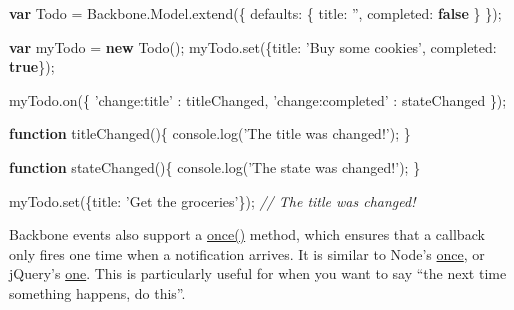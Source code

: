 \documentclass[9pt]{book}
\newenvironment{Shaded}{}{}
\newcommand{\KeywordTok}[1]{\textcolor[rgb]{0.00,0.44,0.13}{\textbf{{#1}}}}
\newcommand{\DataTypeTok}[1]{\textcolor[rgb]{0.56,0.13,0.00}{{#1}}}
\newcommand{\StringTok}[1]{\textcolor[rgb]{0.25,0.44,0.63}{{#1}}}
\newcommand{\CommentTok}[1]{\textcolor[rgb]{0.38,0.63,0.69}{\textit{{#1}}}}
\newcommand{\OtherTok}[1]{\textcolor[rgb]{0.00,0.44,0.13}{{#1}}}
\newcommand{\FunctionTok}[1]{\textcolor[rgb]{0.02,0.16,0.49}{{#1}}}
\newcommand{\NormalTok}[1]{{#1}}
\begin{document}
\begin{Shaded}
\begin{Highlighting}[]

\KeywordTok{var} \NormalTok{Todo = }\OtherTok{Backbone}\NormalTok{.}\OtherTok{Model}\NormalTok{.}\FunctionTok{extend}\NormalTok{(\{}
  \DataTypeTok{defaults}\NormalTok{: \{}
    \DataTypeTok{title}\NormalTok{: }\StringTok{''}\NormalTok{,}
    \DataTypeTok{completed}\NormalTok{: }\KeywordTok{false}
  \NormalTok{\}}
\NormalTok{\});}

\KeywordTok{var} \NormalTok{myTodo = }\KeywordTok{new} \FunctionTok{Todo}\NormalTok{();}
\OtherTok{myTodo}\NormalTok{.}\FunctionTok{set}\NormalTok{(\{}\DataTypeTok{title}\NormalTok{: }\StringTok{'Buy some cookies'}\NormalTok{, }\DataTypeTok{completed}\NormalTok{: }\KeywordTok{true}\NormalTok{\});}

\OtherTok{myTodo}\NormalTok{.}\FunctionTok{on}\NormalTok{(\{}
   \StringTok{'change:title'} \NormalTok{: titleChanged,}
   \StringTok{'change:completed'} \NormalTok{: stateChanged}
\NormalTok{\});}

\KeywordTok{function} \FunctionTok{titleChanged}\NormalTok{()\{}
  \OtherTok{console}\NormalTok{.}\FunctionTok{log}\NormalTok{(}\StringTok{'The title was changed!'}\NormalTok{);}
\NormalTok{\}}

\KeywordTok{function} \FunctionTok{stateChanged}\NormalTok{()\{}
  \OtherTok{console}\NormalTok{.}\FunctionTok{log}\NormalTok{(}\StringTok{'The state was changed!'}\NormalTok{);}
\NormalTok{\}}

\OtherTok{myTodo}\NormalTok{.}\FunctionTok{set}\NormalTok{(\{}\DataTypeTok{title}\NormalTok{: }\StringTok{'Get the groceries'}\NormalTok{\});}
\CommentTok{// The title was changed! }
\end{Highlighting}
\end{Shaded}

Backbone events also support a
\href{http://backbonejs.org/\#Events-once}{once()} method, which ensures
that a callback only fires one time when a notification arrives. It is
similar to Node's
\href{http://nodejs.org/api/events.html\#events_emitter_once_event_listener}{once},
or jQuery's \href{http://api.jquery.com/one/}{one}. This is particularly
useful for when you want to say ``the next time something happens, do
this''.
\end{document}
